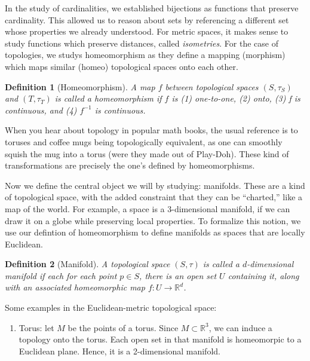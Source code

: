 \documentclass{article}
\newtheorem*{defn}{Definition}
\begin{document}
In the study of cardinalities, we established bijections as functions that
preserve cardinality. This allowed us to reason about sets by referencing a
different set whose properties we already understood. For metric spaces, it
makes sense to study functions which preserve distances, called
\textit{isometries}. For the case of topologies, we studys homeomorphism as
they define a mapping (morphism) which maps similar (homeo) topological spaces
onto each other.

\begin{defn}[Homeomorphism]
    A map $f$ between topological spaces $(S, \tau_S)$ and $(T, \tau_T)$ is
    called a homeomorphism if $f$ is (1) one-to-one, (2) onto, (3) f is
    continuous, and (4) $f^{-1}$ is continuous.
\end{defn}

When you hear about topology in popular math books, the usual reference is to
toruses and coffee mugs being topologically equivalent, as one can smoothly
squish the mug into a torus (were they made out of Play-Doh). These kind of
transformations are precisely the one's defined by homeomorphisms.

Now we define the central object we will by studying: manifolds. These are a
kind of topological space, with the added constraint that they can be
``charted,'' like a map of the world. For example, a space is a
3-dimensional manifold, if we can draw it on a globe while preserving local
properties. To formalize this notion, we use our defintion of homeomorphism to
define manifolds as spaces that are locally Euclidean.

\begin{defn}[Manifold]
    A topological space $(S, \tau)$ is called a $d$-dimensional manifold if
    each for each point $p \in S$, there is an open set $U$ containing it,
    along with an associated homeomorphic map $f: U\rightarrow \mathbb{R}^d$.
\end{defn}

Some examples in the Euclidean-metric topological space:
\begin{enumerate}
    \item Torus: let $M$ be the points of a torus. Since $M \subset
        \mathbb{R}^3$, we can induce a topology onto the torus. Each open set in
        that manifold is homeomorpic to a Euclidean plane. Hence, it is a
        2-dimensional manifold.
\end{enumerate}
\end{document}
